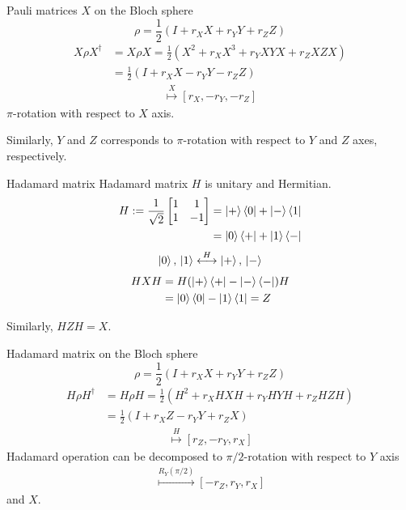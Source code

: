 \documentclass{beamer}
\begin{document}
\begin{frame}{Pauli matrices $X$ on the Bloch sphere}
\begin{equation*}
\rho = \frac12\left(I + r_X X + r_Y Y + r_Z Z\right)
\end{equation*}
\begin{align*}
X\rho X^\dagger &= X\rho X =  \frac12\left(X^2 + r_X X^3 + r_Y XYX + r_Z XZX\right)\\
&=  \frac12\left(I + r_X X - r_Y Y - r_Z Z\right)
\end{align*}
\begin{align*}
[r_X,r_Y,r_Z]\overset{X}{\longmapsto} [r_X,-r_Y,-r_Z]
\end{align*}
$\pi$-rotation with respect to $X$ axis.

\vspace{1em}
Similarly, $Y$ and $Z$ corresponds to $\pi$-rotation with respect to $Y$ and $Z$ axes, respectively.
\end{frame}

\begin{frame}{Hadamard matrix}
Hadamard matrix $H$ is unitary and Hermitian.
\begin{align*}
H:=\frac1{\sqrt{2}}\begin{bmatrix}1&1\\1&-1\end{bmatrix}
&=\ket{+}\bra{0}+\ket{-}\bra{1}\\
&=\ket{0}\bra{+}+\ket{1}\bra{-}
\end{align*}
\begin{align*}
\ket{0},\,\ket{1} \overset{H}{\longleftrightarrow} \ket{+},\,\ket{-}
\end{align*}
\begin{align*}
HXH &= H(\ket{+}\bra{+}-\ket{-}\bra{-})H\\
&= \ket{0}\bra{0}-\ket{1}\bra{1} = Z
\end{align*}

Similarly, $HZH=X$.
\end{frame}

\begin{frame}{Hadamard matrix on the Bloch sphere}
\begin{equation*}
\rho = \frac12\left(I + r_X X + r_Y Y + r_Z Z\right)
\end{equation*}
\begin{align*}
H\rho H^\dagger &= H\rho H =  \frac12\left(H^2 + r_X HXH + r_Y HYH + r_Z HZH\right)\\
&=  \frac12\left(I + r_X Z - r_Y Y + r_Z X\right)
\end{align*}
\begin{align*}
[r_X,r_Y,r_Z]\overset{H}{\longmapsto} [r_Z,-r_Y,r_X]
\end{align*}
Hadamard operation can be decomposed to $\pi/2$-rotation with respect to $Y$ axis
\begin{align*}
[r_X,r_Y,r_Z]\overset{R_Y(\pi/2)}{\longmapsto} [-r_Z,r_Y,r_X]
\end{align*}
and $X$.
\end{frame}
\end{document}
